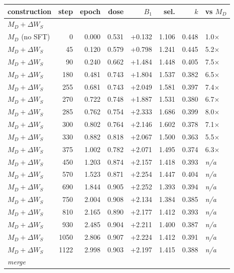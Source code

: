 \begin{table}[h]
\centering
\small
\begin{tabular}{lrrrrrrl}
\toprule
construction & step & epoch & dose & $B_1$ & sel. & $k$ & vs $M_D$ \\
\midrule
\multicolumn{8}{l}{\emph{$M_D{+}\Delta W_S$}} \\
$M_D$ (no SFT) & 0 & 0.000 & 0.531 & +0.132 & 1.106 & 0.448 & 1.0$\times$ \\
$M_D{+}\Delta W_S$ & 45 & 0.120 & 0.579 & +0.798 & 1.241 & 0.445 & 5.2$\times$ \\
$M_D{+}\Delta W_S$ & 90 & 0.240 & 0.662 & +1.484 & 1.448 & 0.405 & 7.5$\times$ \\
$M_D{+}\Delta W_S$ & 180 & 0.481 & 0.743 & +1.804 & 1.537 & 0.382 & 6.5$\times$ \\
$M_D{+}\Delta W_S$ & 255 & 0.681 & 0.743 & +2.049 & 1.581 & 0.397 & 7.4$\times$ \\
$M_D{+}\Delta W_S$ & 270 & 0.722 & 0.748 & +1.887 & 1.531 & 0.380 & 6.7$\times$ \\
$M_D{+}\Delta W_S$ & 285 & 0.762 & 0.754 & +2.333 & 1.686 & 0.399 & 8.0$\times$ \\
$M_D{+}\Delta W_S$ & 300 & 0.802 & 0.764 & +2.146 & 1.602 & 0.378 & 7.1$\times$ \\
$M_D{+}\Delta W_S$ & 330 & 0.882 & 0.818 & +2.067 & 1.500 & 0.363 & 5.5$\times$ \\
$M_D{+}\Delta W_S$ & 375 & 1.002 & 0.782 & +2.071 & 1.495 & 0.374 & 6.3$\times$ \\
$M_D{+}\Delta W_S$ & 450 & 1.203 & 0.874 & +2.157 & 1.418 & 0.393 & \textit{n/a} \\
$M_D{+}\Delta W_S$ & 570 & 1.523 & 0.871 & +2.254 & 1.447 & 0.404 & \textit{n/a} \\
$M_D{+}\Delta W_S$ & 690 & 1.844 & 0.905 & +2.252 & 1.393 & 0.394 & \textit{n/a} \\
$M_D{+}\Delta W_S$ & 750 & 2.004 & 0.908 & +2.134 & 1.384 & 0.385 & \textit{n/a} \\
$M_D{+}\Delta W_S$ & 810 & 2.165 & 0.890 & +2.177 & 1.412 & 0.393 & \textit{n/a} \\
$M_D{+}\Delta W_S$ & 930 & 2.485 & 0.904 & +2.211 & 1.400 & 0.387 & \textit{n/a} \\
$M_D{+}\Delta W_S$ & 1050 & 2.806 & 0.907 & +2.224 & 1.412 & 0.391 & \textit{n/a} \\
$M_D{+}\Delta W_S$ & 1122 & 2.998 & 0.903 & +2.197 & 1.415 & 0.388 & \textit{n/a} \\
\midrule
\multicolumn{8}{l}{\emph{merge}} \\

\end{tabular}
\end{table}
